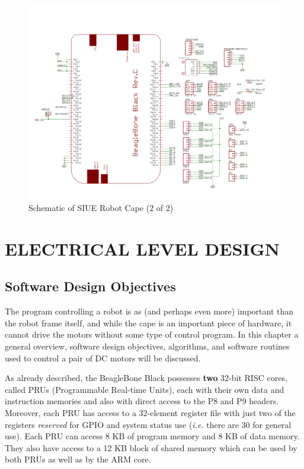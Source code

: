 \documentclass[12pt,oneside,final]{siuethesis}
\theoremstyle{definition}
\begin{document}
\begin{figure}
 \centering
 \includegraphics[scale=.25,keepaspectratio=true]{./images/schematic_2.png}
 \caption{Schematic of SIUE Robot Cape (2 of 2)}
 \label{fig:Schematic_2}
\end{figure}


\chapter{ELECTRICAL LEVEL DESIGN}

\section{Software Design Objectives}

The program controlling a robot is as (and perhaps even more) important than the robot frame itself, and while the cape is an important piece of hardware, it cannot drive the motors without some type of control program. In this chapter a general overview, software design objectives, algorithms, and software routines used to control a pair of DC motors will be discussed.

As already described, the BeagleBone Black possesses \textbf{two} 32-bit RISC cores, called PRUs (Programmable Real-time Units), each with their own data and instruction memories and also with direct access to the P8 and P9 headers. Moreover, each PRU has access to a 32-element register file with just two of the registers \emph{reserved} for GPIO and system status use (\emph{i.e.} there are 30 for general use).  Each PRU can access 8 KB of program memory and 8 KB of data memory. They also have access to a 12 KB block of shared memory which can be used by both PRUs as well as by the ARM core.
\end{document}
